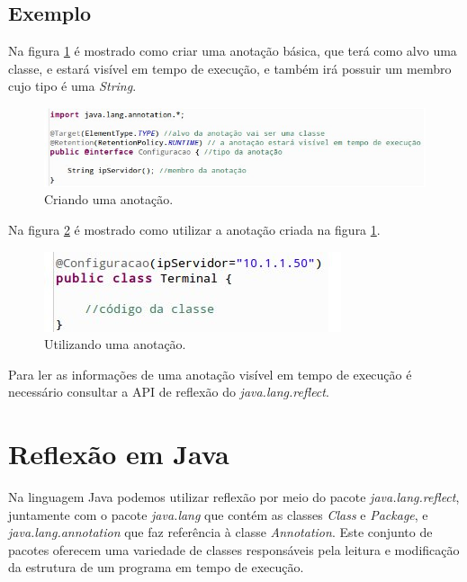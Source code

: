 \documentclass[tc,openright]{iiufrgs}
\begin{document}
\subsection{Exemplo}

Na figura \ref{fig:criandoAnotacao} é mostrado como criar uma anotação básica, que terá como alvo uma classe, e estará visível em tempo de execução, e também irá possuir um membro cujo tipo é uma \textit{String}.

\begin{figure}[ht]
	\centering
	\includegraphics[scale=0.6]{figuras/criandoAnnotation.jpg}
	\caption{Criando uma anotação.}
	\label{fig:criandoAnotacao}
\end{figure}

Na figura \ref{fig:usandoAnotacao} é mostrado como utilizar a anotação criada na figura  \ref{fig:criandoAnotacao}.

\begin{figure}[ht]
	\centering
	\includegraphics[scale=0.6]{figuras/usandoAnnotation.jpg}
	\caption{Utilizando uma anotação.}
	\label{fig:usandoAnotacao}
\end{figure}

Para ler as informações de uma anotação visível em tempo de execução é necessário consultar a API de reflexão do \textit{java.lang.reflect}.

\section{Reflexão em Java}
Na linguagem Java podemos utilizar reflexão por meio do pacote \textit{java.lang.reflect}, juntamente com o pacote \textit{java.lang} que contém as classes \textit{Class} e \textit{Package}, e \textit{java.lang.annotation} que faz referência à classe \textit{Annotation}. Este conjunto de pacotes oferecem uma variedade de classes responsáveis pela leitura e modificação da estrutura de um programa em tempo de execução.
\end{document}
